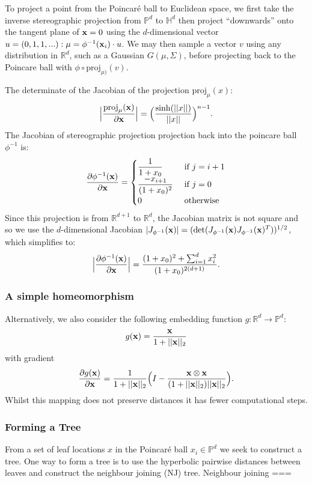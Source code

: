\documentclass[11pt, twocolumn]{article}
\newcommand{\be}{\begin{equation*}}
\newcommand{\ee}{\end{equation*}}
\newcommand{\bee}{\begin{eqnarray*}}
\newcommand{\eee}{\end{eqnarray*}}
\begin{document}
To project a point from the Poincaré ball to Euclidean space, we first take the inverse stereographic projection from $\mathbb{P}^d$ to $\mathbb{H}^d$ then project ``downwards'' onto the tangent plane of $\bold{x}=0$ using the $d$-dimensional vector $u=(0, 1, 1,...): \mu = \phi^{-1}(\bold{x}_{i}) \cdot u $.
We may then sample a vector $v$ using any distribution in $\mathbb{R}^d$, such as a Gaussian $G(\mu, \Sigma)$, before projecting back to the Poincare ball with $\phi \circ \text{proj}_{\mu)}(v)$.

The determinate of the Jacobian of the projection $\text{proj}_{\mu}(x)$:
\be
\Big| \frac{\text{proj}_{\mu} (\bold{x})} {\partial \bold{x}} \Big| = \Big(\dfrac{\sinh(||x||)}{||x||}\Big)^{n-1}.
\ee
The Jacobian of stereographic projection projection back into the poincare ball $\phi^{-1}$ is:
\bee
\frac{\partial \phi^{-1}(\bold{x})} {\partial \bold{x}} = \begin{cases}
\dfrac{1}{1+x_{0}} &\text{ if } j = i+1\\
\dfrac{-x_{i+1}}{(1+x_{0})^{2}} &\text{ if } j = 0\\
0 &\text{ otherwise}\\
\end{cases}
\eee
Since this projection is from $\mathbb{R}^{d+1}$ to $\mathbb{R}^{d}$, the Jacobian matrix is not square and so we  use the $d$-dimensional Jacobian $|J_{\phi^{-1}}(\bold{x})| = (\text{det} (J_{\phi^{-1}} (\bold{x}) J_{\phi^{-1}} (\bold{x})^{T}))^{1/2}$, which simplifies to:
\be
\Big|\frac{\partial {\phi^{-1}}(\bold{x})}{\partial \bold{x}}\Big| = \dfrac{(1+x_{0})^{2} + \sum_{i=1}^{d} x_{i}^{2}}{(1+x_{0})^{2(d+1)}}.
\ee

\subsubsection{A simple homeomorphism}
Alternatively, we also consider the following embedding function $g: \mathbb{R}^{d} \to \mathbb{P}^{d}$:
\be
g(\bold{x}) = \dfrac{\bold{x}}{1+||\bold{x}||_{2}}
\ee
with gradient
\be
\frac{\partial g(\bold{x})}{\partial \bold{x}} = 
\dfrac{1}{1+||\bold{x}||_{2}} \Big( I - \dfrac{\bold{x} \otimes \bold{x}}{(1+||\bold{x}||_{2})||\bold{x}||_{2}} \Big).
\ee
Whilst this mapping does not preserve distances it has fewer computational steps.

\subsubsection{Forming a Tree}
From a set of leaf locations $x$ in the Poincaré ball $x_i \in \mathbb{P}^d$ we seek to construct a tree.
One way to form a tree is to use the hyperbolic pairwise distances between leaves and construct the neighbour joining (NJ) tree.
Neighbour joining ===
\end{document}

